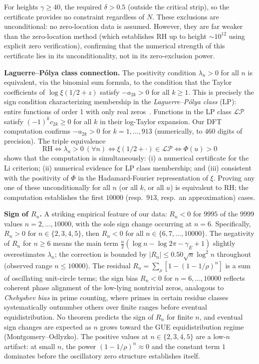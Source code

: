 \documentclass[11pt]{article}
\begin{document}
\noindent
For heights $\gamma \ge 40$, the required $\delta > 0.5$ (outside the critical strip),
so the certificate provides no constraint regardless of $N$. These exclusions are unconditional:
no zero-location data is assumed. However, they are far weaker than the zero-location
method (which establishes RH up to height $\sim 10^{12}$ using explicit zero verification),
confirming that the numerical strength of this certificate lies in its unconditionality,
not in its zero-exclusion power.

\textbf{Laguerre--P\'olya class connection.}
The positivity condition $\lambda_n > 0$ for all $n$ is equivalent, via the binomial
sum formula, to the condition that the Taylor coefficients of $\log\xi(1/2+z)$ satisfy
$-a_{2k} > 0$ for all $k \ge 1$. This is precisely the sign condition characterizing
membership in the \emph{Laguerre--P\'olya class} (LP): entire functions of order 1
with only real zeros~\cite{polya1926}. Functions in the LP class $\mathcal{LP}$ satisfy $(-1)^k c_{2k} \ge 0$
for all $k$ in their log-Taylor expansion. Our DFT computation confirms $-a_{2k} > 0$
for $k = 1, \ldots, 913$ (numerically, to $460$ digits of precision). The triple
equivalence
\[
  \text{RH} \iff \lambda_n > 0\ (\forall n) \iff \xi(1/2+\cdot) \in \mathcal{LP}
  \iff \Phi(u) > 0
\]
shows that the computation is simultaneously: (i) a numerical certificate for the Li
criterion; (ii) numerical evidence for LP class membership; and (iii) consistent with
the positivity of $\Phi$ in the Hadamard-Fourier representation of $\xi$.
Proving any one of these unconditionally for all $n$ (or all $k$, or all $u$)
is equivalent to RH; the computation establishes the first $10000$ (resp.\ $913$, resp.\
an approximation) cases.

\textbf{Sign of $R_n$.}
A striking empirical feature of our data: $R_n < 0$ for $9995$ of the $9999$ values
$n = 2, \ldots, 10000$, with the sole sign change occurring at $n = 6$.
Specifically, $R_n > 0$ for $n \in \{2,3,4,5\}$, then $R_n < 0$ for all
$n \in \{6, 7, \ldots, 10000\}$. The negativity of $R_n$ for $n \ge 6$ means the
main term $\tfrac{n}{2}(\log n - \log 2\pi - \gamma_E + 1)$ slightly overestimates
$\lambda_n$; the correction is bounded by $|R_n| \le 0.50\sqrt{n}\log^2 n$ throughout (observed range $n \le 10000$).
The residual $R_n = \sum_\rho [1-(1-1/\rho)^n]$ is a sum of oscillating unit-circle
terms; the sign bias $R_n < 0$ for $n = 6,\ldots,10000$ reflects coherent phase
alignment of the low-lying nontrivial zeros, analogous to \emph{Chebyshev bias}
in prime counting, where primes in certain residue classes systematically outnumber
others over finite ranges before eventual equidistribution.
No theorem predicts the sign of $R_n$ for finite $n$, and eventual sign changes
are expected as $n$ grows toward the GUE equidistribution regime (Montgomery--Odlyzko).
The positive values at $n \in \{2,3,4,5\}$ are a low-$n$ artifact: at small $n$,
the power $(1-1/\rho)^n \approx 0$ and the constant term $1$ dominates before the
oscillatory zero structure establishes itself.
\end{document}
